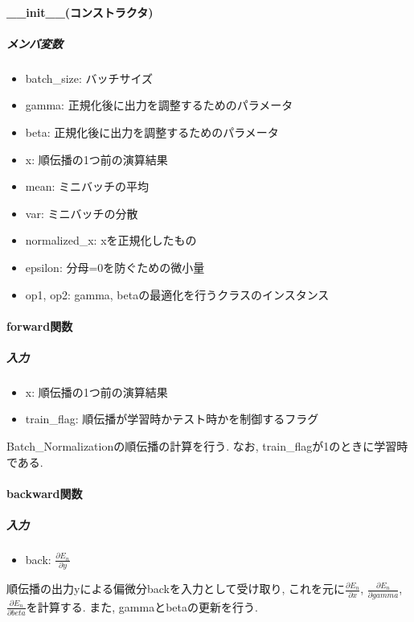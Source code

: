 \documentclass[a4j, titlepage]{jarticle}
\begin{document}
        \paragraph*{\_\_init\_\_(コンストラクタ)}
            \subparagraph*{メンバ変数}
            \begin{itemize}
                \item batch\_size: バッチサイズ
                \item gamma: 正規化後に出力を調整するためのパラメータ
                \item beta: 正規化後に出力を調整するためのパラメータ
                \item x: 順伝播の1つ前の演算結果
                \item mean: ミニバッチの平均
                \item var: ミニバッチの分散
                \item normalized\_x: xを正規化したもの
                \item epsilon: 分母=0を防ぐための微小量
                \item op1, op2: gamma, betaの最適化を行うクラスのインスタンス
            \end{itemize}

        \paragraph*{forward関数}
            \subparagraph*{入力}
            \begin{itemize}
                \item x: 順伝播の1つ前の演算結果
                \item train\_flag: 順伝播が学習時かテスト時かを制御するフラグ
            \end{itemize}
            Batch\_Normalizationの順伝播の計算を行う.
            なお, train\_flagが1のときに学習時である.
        \paragraph*{backward関数}
            \subparagraph*{入力}
            \begin{itemize}
                \item back: \(\displaystyle \frac{\partial E_n}{\partial y}\)
            \end{itemize}
            順伝播の出力yによる偏微分backを入力として受け取り, これを元に\(\displaystyle \frac{\partial E_n}{\partial x}\), \(\displaystyle \frac{\partial E_n}{\partial gamma}\), \(\displaystyle \frac{\partial E_n}{\partial beta}\)を計算する.
            また, gammaとbetaの更新を行う.
\end{document}

